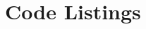 \documentclass[12pt]{article}
\begin{document}
\appendix %
\newpage

\section{Code Listings}\label{code}

%
% 
%
%
%



\newpage  %



\end{document}
